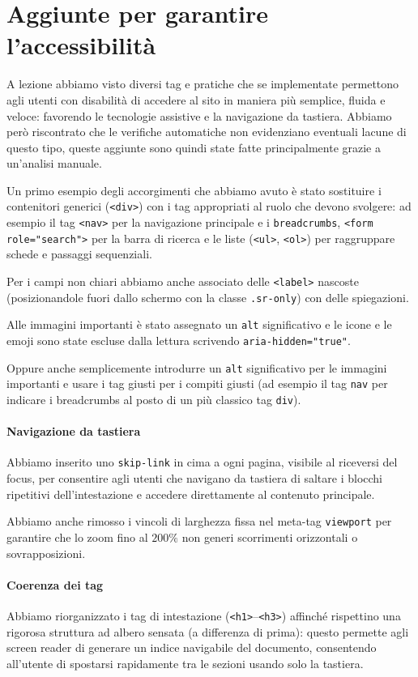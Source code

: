\documentclass[11pt, a4paper]{article}
\begin{document}
    \section{Aggiunte per garantire l'accessibilità}
    A lezione abbiamo visto diversi tag e pratiche che se implementate permettono agli utenti con disabilità di accedere al sito in maniera più semplice, fluida e veloce: favorendo le tecnologie assistive e la navigazione da tastiera. Abbiamo però riscontrato che le verifiche automatiche non evidenziano eventuali lacune di questo tipo, queste aggiunte sono quindi state fatte principalmente grazie a un'analisi manuale.

    Un primo esempio degli accorgimenti che abbiamo avuto è stato sostituire i contenitori generici (\texttt{<div>}) con i tag appropriati al ruolo che devono svolgere: ad esempio il tag \texttt{<nav>} per la navigazione principale e i \texttt{breadcrumbs}, \texttt{<form role="search">} per la barra di ricerca e le liste (\texttt{<ul>}, \texttt{<ol>}) per raggruppare schede e passaggi sequenziali.

    Per i campi non chiari abbiamo anche associato delle \texttt{<label>} nascoste (posizionandole fuori dallo schermo con la classe \texttt{.sr-only}) con delle spiegazioni.

    Alle immagini importanti è stato assegnato un \texttt{alt} significativo e le icone e le emoji sono state escluse dalla lettura scrivendo \texttt{aria-hidden="true"}.

    Oppure anche semplicemente introdurre un \texttt{alt} significativo per le immagini importanti e usare i tag giusti per i compiti giusti (ad esempio il tag \texttt{nav} per indicare i breadcrumbs al posto di un più classico tag \texttt{div}).

    \paragraph{Navigazione da tastiera}
    \par
    Abbiamo inserito uno \texttt{skip-link} in cima a ogni pagina, visibile al riceversi del focus, per consentire agli utenti che navigano da tastiera di saltare i blocchi ripetitivi dell'intestazione e accedere direttamente al contenuto principale.

    Abbiamo anche rimosso i vincoli di larghezza fissa nel meta-tag \texttt{viewport} per garantire che lo zoom fino al $200\%$ non generi scorrimenti orizzontali o sovrapposizioni.

    \paragraph{Coerenza dei tag}
    \par
    Abbiamo riorganizzato i tag di intestazione (\texttt{<h1>}--\texttt{<h3>}) affinché rispettino una rigorosa struttura ad albero sensata (a differenza di prima): questo permette agli screen reader di generare un indice navigabile del documento, consentendo all'utente di spostarsi rapidamente tra le sezioni usando solo la tastiera.
\end{document}
